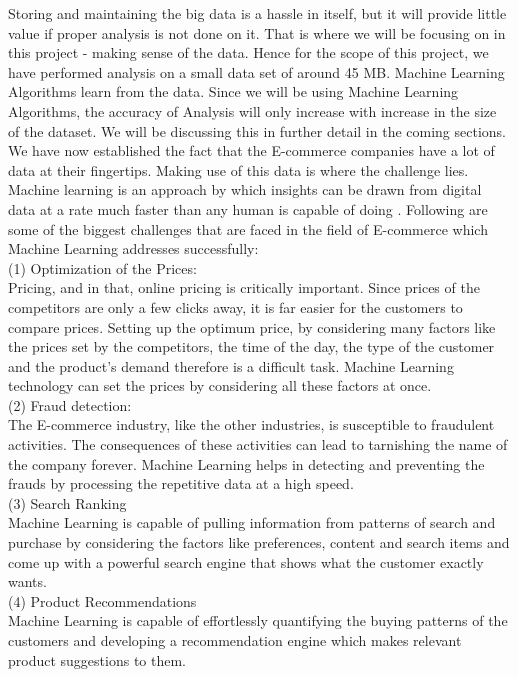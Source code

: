 Storing and maintaining the big data is a hassle in itself, but it will provide little value if proper analysis is not done on it. That is where we will be focusing on in this project - making sense of the data. Hence for the scope of this project, we have performed analysis on a small data set of around 45 MB. Machine Learning Algorithms learn from the data. Since we will be using Machine Learning Algorithms, the accuracy of Analysis will only increase with increase in the size of the dataset. We will be discussing this in further detail in the coming sections.\\
We have now established the fact that the E-commerce companies have a lot of data at their fingertips. Making use of this data is where the challenge lies. Machine learning is an approach by which insights can be drawn from digital data at a rate much faster than any human is capable of doing \cite{link5} . Following are some of the biggest challenges that are faced in the field of E-commerce which Machine Learning addresses successfully:\\
(1) Optimization of the Prices:\\
Pricing, and in that, online pricing is critically important. Since prices of the competitors are only a few clicks away, it is far easier for the customers to compare prices. Setting up the optimum price, by considering many factors like the prices set by the competitors, the time of the day, the type of the customer and the product's demand therefore is a difficult task. Machine Learning technology can set the prices by considering all these factors at once.\\
(2) Fraud detection: \\
The E-commerce industry, like the other industries, is susceptible to fraudulent activities. The consequences of these activities can lead to tarnishing the name of the company forever. Machine Learning helps in detecting and preventing the frauds by processing the repetitive data at a high speed.\\
(3) Search Ranking \\
Machine Learning is capable of pulling information from patterns of search and purchase by considering the factors like preferences, content and search items and come up with a powerful search engine that shows what the customer exactly wants. \\
(4) Product Recommendations \\
Machine Learning is capable of effortlessly quantifying the buying patterns of the customers and developing a recommendation engine which makes relevant product suggestions to them. \\
